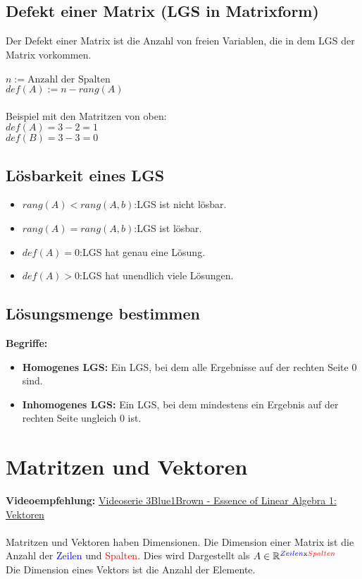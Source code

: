 \documentclass[12pt,a4paper]{article}
\begin{document}
\subsection{Defekt einer Matrix (LGS in Matrixform)}
Der Defekt einer Matrix ist die Anzahl von freien Variablen, die in dem LGS der Matrix vorkommen. \\ \\
$n := \text{Anzahl der Spalten}$ \\
$def(A) := n - rang(A)$ \\ \\
Beispiel mit den Matritzen von oben: \\
$def(A) = 3 - 2 = 1$\\
$def(B) = 3 - 3 = 0$

\subsection{Lösbarkeit eines LGS}
\begin{itemize}
    \item $rang(A) <  rang(A, b)$:\quad LGS ist nicht lösbar.
    \item $rang(A) = rang(A, b)$:\quad LGS ist lösbar.
    \item $def(A) = 0$:\quad LGS hat genau eine Lösung.
    \item $def(A) > 0$:\quad LGS hat unendlich viele Lösungen.
\end{itemize}
\subsection{Lösungsmenge bestimmen}
\textbf{Begriffe:}
\begin{itemize}
    \item \textbf{Homogenes LGS:} Ein LGS, bei dem alle Ergebnisse auf der rechten Seite 0 sind.
    \item \textbf{Inhomogenes LGS:} Ein LGS, bei dem mindestens ein Ergebnis auf der rechten Seite ungleich 0 ist.
\end{itemize}
\section{Matritzen und Vektoren}
\textbf{Videoempfehlung:} \href{https://www.youtube.com/watch?v=fNk_zzaMoSs}{Videoserie 3Blue1Brown - Essence of Linear Algebra 1: Vektoren} \\ \\
Matritzen und Vektoren haben Dimensionen. Die Dimension einer Matrix ist die Anzahl der \textcolor{blue}{Zeilen} und \textcolor{red}{Spalten}. Dies wird Dargestellt als $A \in \mathbb{R}^{\textcolor{blue}{Zeilen}\text{x}\textcolor{red}{Spalten}}$\\ Die Dimension eines Vektors ist die Anzahl der Elemente. \\
\end{document}
